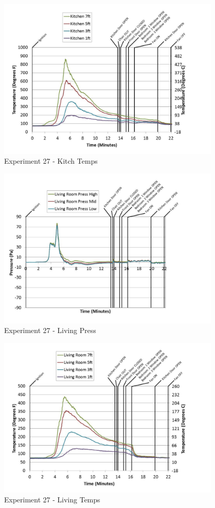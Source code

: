 \documentclass{article}
\begin{document}
\begin{appendices}
	\begin{figure}[h!]
		\centering
		\includegraphics[height=3.05in]{0_Images/Results_Charts/Exp_27_Charts/KitchTemps.pdf}
		\caption{Experiment 27 - Kitch Temps}
	\end{figure}
 
	\clearpage

	\begin{figure}[h!]
		\centering
		\includegraphics[height=3.05in]{0_Images/Results_Charts/Exp_27_Charts/LivingPress.pdf}
		\caption{Experiment 27 - Living Press}
	\end{figure}
 

	\begin{figure}[h!]
		\centering
		\includegraphics[height=3.05in]{0_Images/Results_Charts/Exp_27_Charts/LivingTemps.pdf}
		\caption{Experiment 27 - Living Temps}
	\end{figure}
 

\end{appendices}
\end{document}
